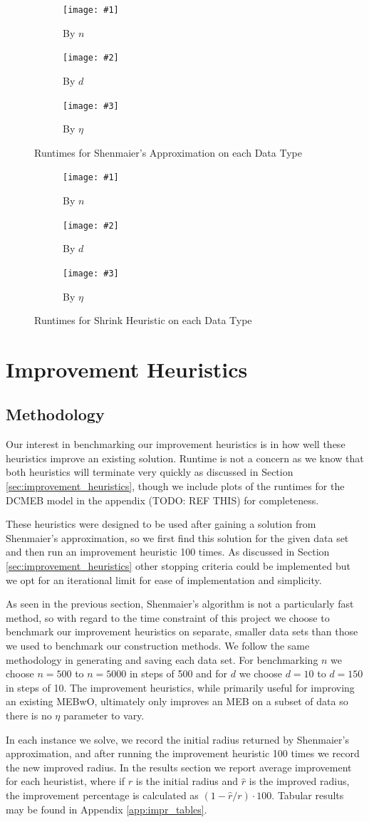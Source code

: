 \documentclass[11pt,twoside]{report}
\newcommand{\benchmarkfigure}[5]{
    \begin{figure}[ht]
        \centering
        \begin{subfigure}[b]{0.475\textwidth}
            \centering
            \texttt{[image: \#1]}
            \caption{By $n$}
            \label{#5_n}
        \end{subfigure}
        \hfill
        \begin{subfigure}[b]{0.475\textwidth}
            \centering
            \texttt{[image: \#2]}
            \caption{By $d$}
            \label{#5_d}
        \end{subfigure}
        
        \begin{subfigure}[b]{0.475\textwidth}
            \centering
            \texttt{[image: \#3]}
            \caption{By $\eta$}
            \label{#5_eta}
        \end{subfigure}
        \caption{#4}
        \label{#5}
    \end{figure}
}
\newcommand{\benchmarkfigurebyfunc}[3]{
    \benchmarkfigure{alg_benchmarks/by_func/#1_func_n_d30_eta0p9.png}{alg_benchmarks/by_func/#1_func_d_n10000_eta0p9.png}{alg_benchmarks/by_func/#1_func_eta_n10000_d30.png}{#2}{#3}
}
\theoremstyle{definition}
\numberwithin{theorem}{section}
\numberwithin{definition}{section}
\numberwithin{lemma}{section}
\numberwithin{proposition}{section}
\numberwithin{equation}{section}
\numberwithin{figure}{section}
\begin{document}
\benchmarkfigurebyfunc{shenmaier}{Runtimes for Shenmaier's Approximation on each Data Type}{fig:shenmaier_benchmarks}

\benchmarkfigurebyfunc{shrink}{Runtimes for Shrink Heuristic on each Data Type}{fig:shrink_benchmarks}


\section{Improvement Heuristics}
\subsection{Methodology}
Our interest in benchmarking our improvement heuristics is in how well these heuristics improve an existing solution. Runtime is not a concern as we know that both heuristics will terminate very quickly as discussed in Section \ref{sec:improvement_heuristics}, though we include plots of the runtimes for the DCMEB model in the appendix (TODO: REF THIS) for completeness.

These heuristics were designed to be used after gaining a solution from Shenmaier's approximation, so we first find this solution for the given data set and then run an improvement heuristic 100 times. As discussed in Section \ref{sec:improvement_heuristics} other stopping criteria could be implemented but we opt for an iterational limit for ease of implementation and simplicity.

As seen in the previous section, Shenmaier's algorithm is not a particularly fast method, so with regard to the time constraint of this project we choose to benchmark our improvement heuristics on separate, smaller data sets than those we used to benchmark our construction methods. We follow the same methodology in generating and saving each data set. For benchmarking $n$ we choose $n=500$ to $n=5000$ in steps of 500 and for $d$ we choose $d=10$ to $d=150$ in steps of 10. The improvement heuristics, while primarily useful for improving an existing MEBwO, ultimately only improves an MEB on a subset of data so there is no $\eta$ parameter to vary.

In each instance we solve, we record the initial radius returned by Shenmaier's approximation, and after running the improvement heuristic 100 times we record the new improved radius. In the results section we report average improvement for each heuristist, where if $r$ is the initial radius and $\hat{r}$ is the improved radius, the improvement percentage is calculated as $(1-\hat{r}/r)\cdot100$. Tabular results may be found in Appendix \ref{app:impr_tables}.
\end{document}
